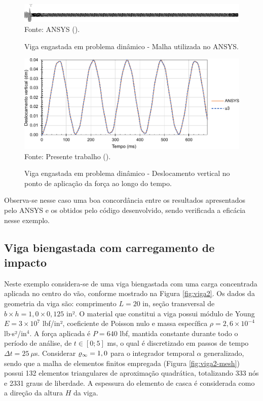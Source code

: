 \begin{figure}[h!]
    \centering
    \caption{Viga engastada em problema dinâmico - Malha utilizada no ANSYS.}
    \includegraphics[width=\linewidth]{Figuras/vigas/ANSYSmesh1.png}
    \\Fonte: ANSYS (\the\year).
    \label{fig:beamANSYS1}
\end{figure}

\begin{figure}[h!]
    \centering
    \caption{Viga engastada em problema dinâmico - Deslocamento vertical no ponto de aplicação da força ao longo do tempo.}
    \includegraphics[width=.8\linewidth]{Figuras/vigas/res1.pdf}
    \\Fonte: Presente trabalho (\the\year).
    \label{fig:res-viga1}
\end{figure}

Observa-se nesse caso uma boa concordância entre os resultados apresentados pelo ANSYS e os obtidos pelo código desenvolvido, sendo verificada a eficácia nesse exemplo.

\subsection{Viga biengastada com carregamento de impacto} \label{Ap:DinBeam2}

Neste exemplo considera-se de uma viga biengastada com uma carga concentrada aplicada no centro do vão, conforme mostrado na Figura \ref{fig:viga2}. Os dados da geometria da viga são: comprimento $L=20$ in, seção transversal de $b\times h=1,0\times0,125$ in². O material que constitui a viga possui módulo de Young $E=3\times10^{7}$ lbf/in², coeficiente de Poisson nulo e massa específica $\rho=2,6\times10^{-4}$ lb$\cdot$s²/in$^4$. A força aplicada é $P=640$ lbf, mantida constante durante todo o período de análise, de $t\in[0;5]$ ms, o qual é discretizado em passos de tempo $\Delta t=25\ \mu$s. Considerar $\varrho_\infty=1,0$ para o integrador temporal $\alpha$ generalizado, sendo que a malha de elementos finitos empregada (Figura \ref{fig:viga2-mesh}) possui 132 elementos triangulares de aproximação quadrática, totalizando 333 nós e 2331 graus de liberdade. A espessura do elemento de casca é considerada como a direção da altura $H$ da viga.

